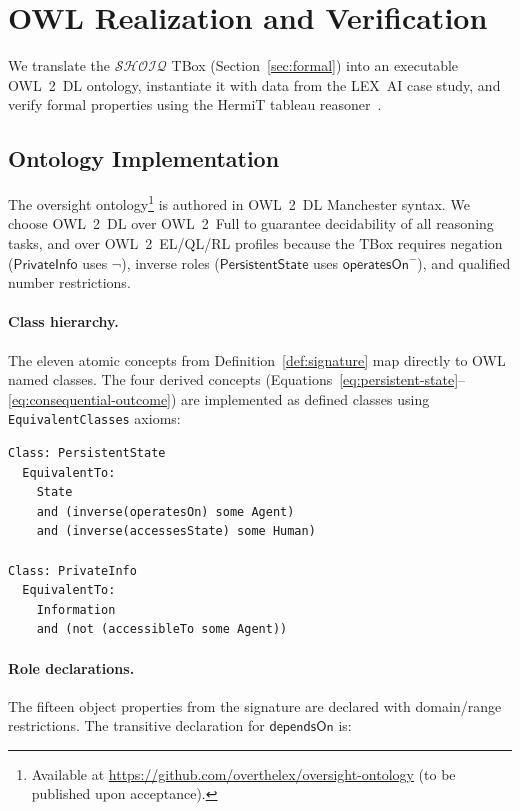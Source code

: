 \documentclass[11pt]{article}
\newcommand{\DL}{\ensuremath{\mathcal{SHOIQ}}\xspace}
\begin{document}
\section{OWL Realization and Verification}
\label{sec:owl}

We translate the \DL TBox (Section~\ref{sec:formal}) into an executable OWL~2~DL ontology, instantiate it with data from the LEX~AI case study, and verify formal properties using the HermiT tableau reasoner~\citep{glimm2014hermit}.

\subsection{Ontology Implementation}
\label{sec:owl-impl}

The oversight ontology\footnote{Available at \url{https://github.com/overthelex/oversight-ontology} (to be published upon acceptance).} is authored in OWL~2~DL Manchester syntax.
We choose OWL~2~DL over OWL~2~Full to guarantee decidability of all reasoning tasks, and over OWL~2~EL/QL/RL profiles because the TBox requires negation ($\mathsf{PrivateInfo}$ uses $\neg$), inverse roles ($\mathsf{PersistentState}$ uses $\mathsf{operatesOn}^{-}$), and qualified number restrictions.

\paragraph{Class hierarchy.}
The eleven atomic concepts from Definition~\ref{def:signature} map directly to OWL named classes.
The four derived concepts (Equations~\ref{eq:persistent-state}--\ref{eq:consequential-outcome}) are implemented as defined classes using \texttt{EquivalentClasses} axioms:

\begin{small}
\begin{verbatim}
Class: PersistentState
  EquivalentTo:
    State
    and (inverse(operatesOn) some Agent)
    and (inverse(accessesState) some Human)

Class: PrivateInfo
  EquivalentTo:
    Information
    and (not (accessibleTo some Agent))
\end{verbatim}
\end{small}

\paragraph{Role declarations.}
The fifteen object properties from the signature are declared with domain/range restrictions.
The transitive declaration for $\mathsf{dependsOn}$ is:
\end{document}
